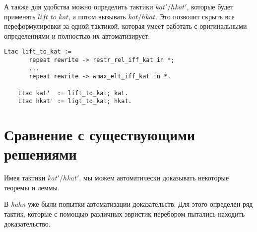 \documentclass[times
              ]{itmo-student-thesis}
\begin{document}
    А также для удобства можно определить тактики $ kat' $/$ hkat' $, которые будет применять $ lift\_to\_kat $, а потом вызывать $ kat $/$ hkat $.
    Это позволит скрыть все переформулировки за одной тактикой, которая умеет работать с оригинальными определениями и полностью их автоматизирует.

    \begin{lstlisting}[mathescape=true, language=coq]
    Ltac lift_to_kat :=
       repeat rewrite -> restr_rel_iff_kat in *;
       ...
       repeat rewrite -> wmax_elt_iff_kat in *.

    Ltac kat'  := lift_to_kat; kat.
    Ltac hkat' := ligt_to_kat; hkat.
    \end{lstlisting}





  \section{Сравнение с существующими решениями}

    Имея тактики $ kat' $/$ hkat' $, мы можем автоматически доказывать некоторые теоремы и леммы.

    В \textit{hahn} уже были попытки автоматизации доказательств.
    Для этого определен ряд тактик, которые с помощью различных эвристик перебором пытались находить доказательство.
\end{document}
